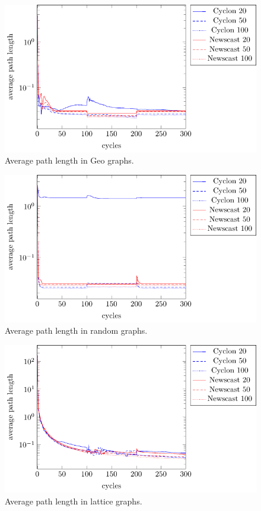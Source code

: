 \documentclass[a4paper]{ifacconf}
\begin{document}
\begin{figure}[p]
    \centering
    \includegraphics[width=.9\linewidth]{"figures/average_path_length/average path length geo"}
    \caption{Average path length in Geo graphs.}
    \label{fig:average-path-length-geo}
\end{figure}
\begin{figure}[p]
    \centering
    \includegraphics[width=.9\linewidth]{"figures/average_path_length/average path length random"}
    \caption{Average path length in random graphs.}
    \label{fig:average-path-length-random}
\end{figure}
\begin{figure}[p]
    \centering
    \includegraphics[width=.9\linewidth]{"figures/average_path_length/average path length lattice"}
    \caption{Average path length in lattice graphs.}
    \label{fig:average-path-length-lattice}
\end{figure}
\end{document}
